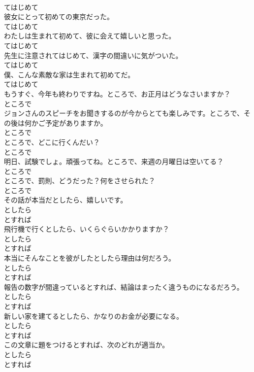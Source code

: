 \documentclass[8pt]{extreport}
\begin{document}
\begin{CJK}{UTF8}{min}
\\	てはじめて	
\\	彼女にとって初めての東京だった。	
\\	てはじめて	
\\	わたしは生まれて初めて、彼に会えて嬉しいと思った。	
\\	てはじめて	
\\	先生に注意されてはじめて、漢字の間違いに気がついた。	
\\	てはじめて	
\\	僕、こんな素敵な家は生まれて初めてだ。	
\\	てはじめて	
\\	もうすぐ、今年も終わりですね。ところで、お正月はどうなさいますか？	
\\	ところで	
\\	ジョンさんのスピーチをお聞きするのが今からとても楽しみです。ところで、その後は何かご予定がありますか。	
\\	ところで	
\\	ところで、どこに行くんだい？	
\\	ところで	
\\	明日、試験でしょ。頑張ってね。ところで、来週の月曜日は空いてる？	
\\	ところで	
\\	ところで、罰則、どうだった？何をさせられた？	
\\	ところで	
\\	その話が本当だとしたら、嬉しいです。	
\\	としたら 
\\	とすれば	
\\	飛行機で行くとしたら、いくらぐらいかかりますか？	
\\	としたら 
\\	とすれば	
\\	本当にそんなことを彼がしたとしたら理由は何だろう。	
\\	としたら 
\\	とすれば	
\\	報告の数字が間違っているとすれば、結論はまったく違うものになるだろう。	
\\	としたら 
\\	とすれば	
\\	新しい家を建てるとしたら、かなりのお金が必要になる。	
\\	としたら 
\\	とすれば	
\\	この文章に題をつけるとすれば、次のどれが適当か。	
\\	としたら 
\\	とすれば	

\end{CJK}
\end{document}
